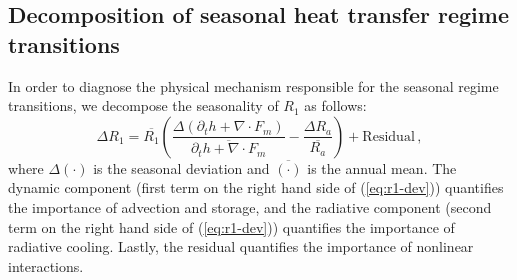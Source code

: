 \documentclass{ametsocV5}
\begin{document}

    \subsection{Decomposition of seasonal heat transfer regime transitions}

    In order to diagnose the physical mechanism responsible for the seasonal regime transitions, we decompose the seasonality of $R_1$ as follows:
    \begin{equation}\label{eq:r1-dev}
      \Delta R_1 = \overline{R_1}\left( \frac{\Delta(\partial_t h + \nabla\cdot F_m)}{\overline{\partial_t h + \nabla\cdot F_m}}  - \frac{\Delta R_a }{\overline{R_a}}\right) + \mathrm{Residual} \, ,
    \end{equation}
    where $\Delta(\cdot)$ is the seasonal deviation and $\overline{(\cdot)}$ is the annual mean. The dynamic component (first term on the right hand side of (\ref{eq:r1-dev})) quantifies the importance of advection and storage, and the radiative component (second term on the right hand side of (\ref{eq:r1-dev})) quantifies the importance of radiative cooling. Lastly, the residual quantifies the importance of nonlinear interactions.
\end{document}
